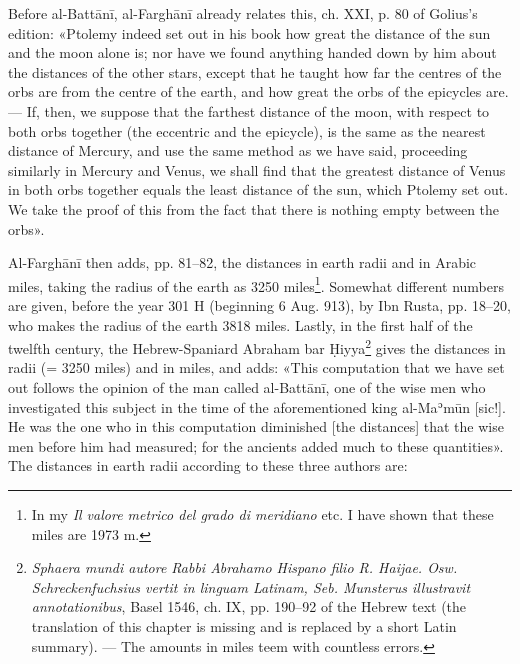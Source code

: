 \documentclass[11pt]{article}
\newcommand{\Pg}[1]{\marginpar{\footnotesize\color{gray}#1}}
\begin{document}
\par Before al-Battānī, al-Farghānī already relates this, ch. XXI, p. 80 of Golius's edition: «Ptolemy indeed set out in his book how great the distance of the sun and the moon alone is; nor have we found anything handed down by him about the distances of the other stars, except that he taught how far the centres of the orbs are from the centre of the earth, and how great the orbs of the epicycles are. — If, then, we suppose that the farthest distance of the moon, with respect to both orbs together (the eccentric and the epicycle), is the same as the nearest distance of Mercury, and use the same method as we have said, proceeding similarly in Mercury and Venus, we shall find that the greatest distance of Venus in both orbs together equals the least distance of the sun, which Ptolemy set out. We take the proof of this from the fact that there is nothing empty between the orbs».\par
\par \Pg{I 287}Al-Farghānī then adds, pp. 81–82, the distances in earth radii and in Arabic miles, taking the radius of the earth as 3250 miles\footnote{In my \emph{Il valore metrico del grado di meridiano} etc. I have shown that these miles are 1973 m.}. Somewhat different numbers are given, before the year 301 H (beginning 6 Aug. 913), by Ibn Rusta, pp. 18–20, who makes the radius of the earth 3818 miles. Lastly, in the first half of the twelfth century, the Hebrew-Spaniard Abraham bar Ḥiyya\footnote{\emph{Sphaera mundi autore Rabbi Abrahamo Hispano filio R. Haijae. Osw. Schreckenfuchsius vertit in linguam Latinam, Seb. Munsterus illustravit annotationibus}, Basel 1546, ch. IX, pp. 190–92 of the Hebrew text (the translation of this chapter is missing and is replaced by a short Latin summary). — The amounts in miles teem with countless errors.} gives the distances in radii (= 3250 miles) and in miles, and adds: «This computation that we have set out follows the opinion of the man called al-Battānī, one of the wise men who investigated this subject in the time of the aforementioned king al-Maʾmūn [sic!]. He was the one who in this computation diminished [the distances] that the wise men before him had measured; for the ancients added much to these quantities». The distances in earth radii according to these three authors are:\par
\end{document}
